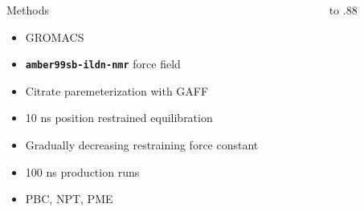 \documentclass{beamer}
\begin{document}
\begin{frame}[t]
\begin{columns}[T,onlytextwidth]
\begin{column}[T]{.48\linewidth}
{\begin{block}{Methods}
            \begin{center}
            \begin{minipage}{0.55\linewidth}%
                \begin{itemize}
                    \item GROMACS
                    \item \textbf{\texttt{amber99sb-ildn-nmr}} force field
                    \item Citrate paremeterization with GAFF
                    \item 10 ns position restrained equilibration
                    \item Gradually decreasing restraining force constant
                    \item 100 ns production runs
                    \item PBC, NPT, PME 
                \end{itemize}  
            \end{minipage}
            \end{center}    

        \end{block}



    }
    \end{column}
    \begin{column}{.48\linewidth}
        \vbox to .88
\end{column}
\end{columns}
\end{frame}
\end{document}
